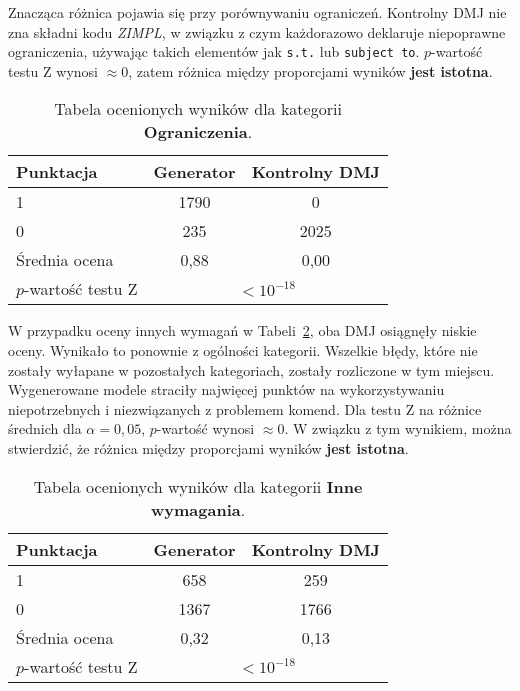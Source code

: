 Znacząca różnica pojawia się przy porównywaniu ograniczeń. Kontrolny DMJ nie zna składni kodu  \textit{ZIMPL}, w związku z czym każdorazowo deklaruje niepoprawne ograniczenia, używając takich elementów jak \texttt{s.t.} lub \texttt{subject to}. %
$p$-wartość testu Z wynosi $\approx0$, zatem różnica między proporcjami wyników \textbf{jest istotna}.

\begin{table}[H]
\caption{Tabela ocenionych wyników dla kategorii \textbf{Ograniczenia}.}\label{tab:tabela21}
\centering%
\begin{tabular}{|l|c|c|}
\hline
\textbf{Punktacja} & \textbf{Generator} & \textbf{Kontrolny DMJ}\\
\hline
1 & 1790 & 0 \\
\hline
0 & 235 & 2025 \\
\hline
Średnia ocena & 0,88 & 0,00 \\
\hline
$p$-wartość testu Z&\multicolumn{2}{c|}{$<10^{-18}$}\\
\hline
\end{tabular}
\end{table}


W przypadku oceny innych wymagań w Tabeli~\ref{tab:tabela22}, oba DMJ osiągnęły niskie oceny. Wynikało to ponownie z ogólności kategorii. Wszelkie błędy, które nie zostały wyłapane w pozostałych kategoriach, zostały rozliczone w tym miejscu. Wygenerowane modele straciły najwięcej punktów na wykorzystywaniu niepotrzebnych i niezwiązanych z problemem komend. Dla testu Z na różnice średnich dla $\alpha = 0,05$, %
$p$-wartość wynosi $\approx0$.
W związku z tym wynikiem, można stwierdzić, że różnica między proporcjami wyników \textbf{jest istotna}.

\begin{table}[H]
\caption{Tabela ocenionych wyników dla kategorii \textbf{Inne wymagania}.}\label{tab:tabela22}
\centering%
\begin{tabular}{|l|c|c|}
\hline
\textbf{Punktacja} & \textbf{Generator} & \textbf{Kontrolny DMJ}\\
\hline
1 & 658 & 259 \\
\hline
0 & 1367 & 1766 \\
\hline
Średnia ocena & 0,32 & 0,13 \\
\hline
$p$-wartość testu Z&\multicolumn{2}{c|}{$<10^{-18}$}\\
\hline
\end{tabular}
\end{table}
